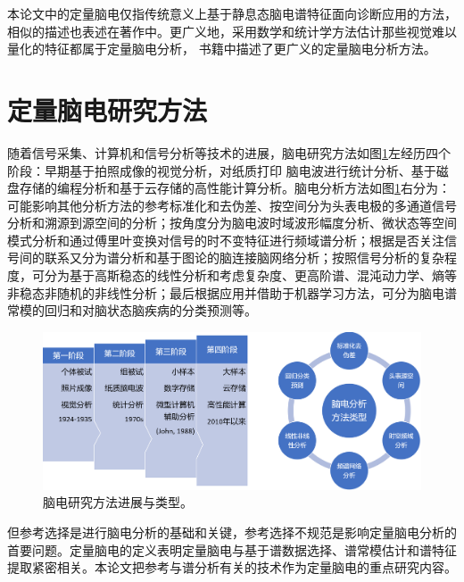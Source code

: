 本论文中的定量脑电仅指传统意义上基于静息态脑电谱特征面向诊断应用的方法，相似的描述也表述在著作\cite{kropotov2010quantitative,evans1999introduction,nuwer1988quantitative}中。更广义地，采用数学和统计学方法估计那些视觉难以量化的特征都属于定量脑电分析，
书籍\cite{tong2009quantitative,majumdar2017brief}中描述了更广义的定量脑电分析方法。

\section{定量脑电研究方法}
随着信号采集、计算机和信号分析等技术的进展，脑电研究方法如图\ref{1:evol}左经历四个阶段：早期基于拍照成像的视觉分析，对纸质打印
脑电波进行统计分析、基于磁盘存储的编程分析和基于云存储的高性能计算分析。脑电分析方法如图\ref{1:evol}右分为：可能影响其他分析方法的参考标准化和去伪差、按空间分为头表电极的多通道信号分析和溯源到源空间的分析；按角度分为脑电波时域波形幅度分析、微状态等空间模式分析和通过傅里叶变换对信号的时不变特征进行频域谱分析；根据是否关注信号间的联系又分为谱分析和基于图论的脑连接脑网络分析；按照信号分析的复杂程度，可分为基于高斯稳态的线性分析和考虑复杂度、更高阶谱、混沌动力学、熵等非稳态非随机的非线性分析；最后根据应用并借助于机器学习方法，可分为脑电谱常模的回归和对脑状态脑疾病的分类预测等。
\begin{figure}[!h]
	\includegraphics[width=15cm]{pic/xulun/evolution.png}
	\caption{脑电研究方法进展与类型。}
	\label{1:evol}
\end{figure}

但参考选择是进行脑电分析的基础和关键，参考选择不规范是影响定量脑电分析的首要问题。定量脑电的定义表明定量脑电与基于谱数据选择、谱常模估计和谱特征提取紧密相关。本论文把参考与谱分析有关的技术作为定量脑电的重点研究内容。

